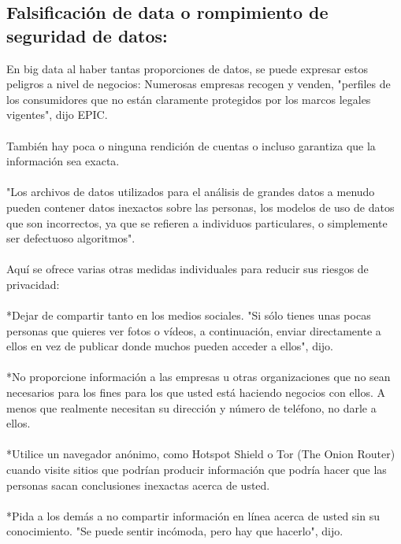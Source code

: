 \documentclass[journal]{IEEEtran}
\begin{document}
\subsection{Falsificación de data o rompimiento de seguridad de datos:}
En big data al haber tantas proporciones de datos, se puede expresar estos peligros a nivel de negocios:
Numerosas empresas recogen y venden, "perfiles de los consumidores que no están claramente protegidos por los marcos legales vigentes", dijo EPIC.\\ \\
También hay poca o ninguna rendición de cuentas o incluso garantiza que la información sea exacta.\\ \\
"Los archivos de datos utilizados para el análisis de grandes datos a menudo pueden contener datos inexactos sobre las personas, los modelos de uso de datos que son incorrectos, ya que se refieren a individuos particulares, o simplemente ser defectuoso algoritmos".\\ \\
Aquí se ofrece varias otras medidas individuales para reducir sus riesgos de privacidad:\\ \\
*Dejar de compartir tanto en los medios sociales. "Si sólo tienes unas pocas personas que quieres ver fotos o vídeos, a continuación, enviar directamente a ellos en vez de publicar donde muchos pueden acceder a ellos", dijo.\\ \\
*No proporcione información a las empresas u otras organizaciones que no sean necesarios para los fines para los que usted está haciendo negocios con ellos. A menos que realmente necesitan su dirección y número de teléfono, no darle a ellos.\\ \\
*Utilice un navegador anónimo, como Hotspot Shield o Tor (The Onion Router) cuando visite sitios que podrían producir información que podría hacer que las personas sacan conclusiones inexactas acerca de usted.\\ \\
*Pida a los demás a no compartir información en línea acerca de usted sin su conocimiento. "Se puede sentir incómoda, pero hay que hacerlo", dijo.
\end{document}
